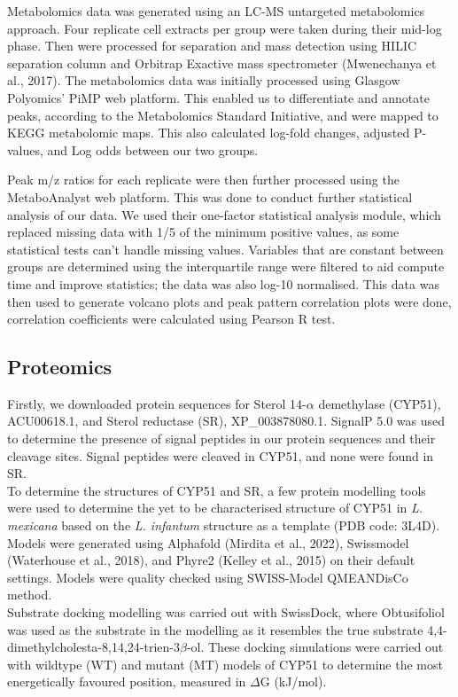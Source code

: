 \documentclass{bioinfo}
\begin{document}
Metabolomics data was generated using an LC-MS untargeted metabolomics
approach. Four replicate cell extracts per group were taken during their
mid-log phase. Then were processed for separation and mass detection
using HILIC separation column and Orbitrap Exactive mass spectrometer
(Mwenechanya et al., 2017). The metabolomics data was initially
processed using Glasgow Polyomics' PiMP web platform. This enabled us to
differentiate and annotate peaks, according to the Metabolomics Standard
Initiative, and were mapped to KEGG metabolomic maps. This also
calculated log-fold changes, adjusted P-values, and Log odds between our
two groups.

Peak m/z ratios for each replicate were then further processed using the
MetaboAnalyst web platform. This was done to conduct further statistical
analysis of our data. We used their one-factor statistical analysis
module, which replaced missing data with 1/5 of the minimum positive
values, as some statistical tests can't handle missing values. Variables
that are constant between groups are determined using the interquartile
range were filtered to aid compute time and improve statistics; the data
was also log-10 normalised. This data was then used to generate volcano
plots and peak pattern correlation plots were done, correlation
coefficients were calculated using Pearson R test.

\subsection{Proteomics}

Firstly, we downloaded protein sequences for Sterol 14-\(\alpha\)
demethylase (CYP51), ACU00618.1, and Sterol reductase (SR),
XP\_003878080.1. SignalP 5.0 was used to determine the presence of
signal peptides in our protein sequences and their cleavage sites.
Signal peptides were cleaved in CYP51, and none were found in SR.\\

To determine the structures of CYP51 and SR, a few protein modelling
tools were used to determine the yet to be characterised structure of
CYP51 in \emph{L. mexicana} based on the \emph{L. infantum} structure as
a template (PDB code: 3L4D). Models were generated using Alphafold
(Mirdita et al., 2022), Swissmodel (Waterhouse et al., 2018), and Phyre2
(Kelley et al., 2015) on their default settings. Models were quality
checked using SWISS-Model QMEANDisCo method.\\

Substrate docking modelling was carried out with SwissDock, where
Obtusifoliol was used as the substrate in the modelling as it resembles
the true substrate 4,4-dimethylcholesta-8,14,24-trien-3\(\beta\)-ol.
These docking simulations were carried out with wildtype (WT) and mutant
(MT) models of CYP51 to determine the most energetically favoured
position, measured in \(\Delta\)G (kJ/mol).\\
\end{document}
